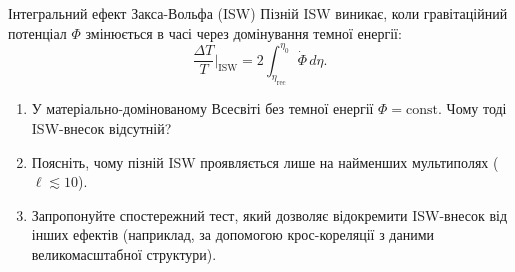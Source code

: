 
\begin{problem}{Інтегральний ефект Закса-Вольфа (ISW)}
Пізній ISW виникає, коли гравітаційний потенціал $\Phi$ змінюється
в часі через домінування темної енергії:
\[
\frac{\Delta T}{T}\Big|_{\text{ISW}} = 2 \int_{\eta_{\text{rec}}}^{\eta_0} \dot{\Phi}\,d\eta.
\]

\begin{enumerate}
    \item У матеріально-домінованому Всесвіті без темної енергії
          $\Phi = \text{const}$. Чому тоді ISW-внесок відсутній?
    \item Поясніть, чому пізній ISW проявляється лише на найменших
          мультиполях ($\ell \lesssim 10$).
    \item Запропонуйте спостережний тест, який дозволяє відокремити
          ISW-внесок від інших ефектів (наприклад, за допомогою
          крос-кореляції з даними великомасштабної структури).
\end{enumerate}
\end{problem}